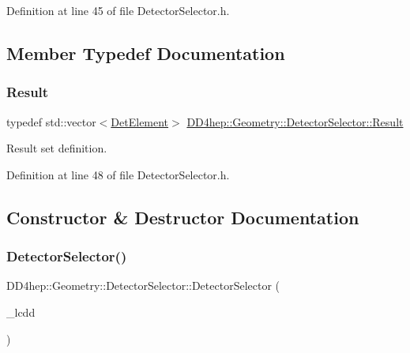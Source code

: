 Definition at line 45 of file Detector\+Selector.\+h.



\subsection{Member Typedef Documentation}
\hypertarget{class_d_d4hep_1_1_geometry_1_1_detector_selector_a6ce0dfe8c83f5d36138244218f260ed1}{}\label{class_d_d4hep_1_1_geometry_1_1_detector_selector_a6ce0dfe8c83f5d36138244218f260ed1} 
\subsubsection{\texorpdfstring{Result}{Result}}
{\footnotesize\ttfamily typedef std\+::vector$<$\hyperlink{class_d_d4hep_1_1_geometry_1_1_det_element}{Det\+Element}$>$ \hyperlink{class_d_d4hep_1_1_geometry_1_1_detector_selector_a6ce0dfe8c83f5d36138244218f260ed1}{D\+D4hep\+::\+Geometry\+::\+Detector\+Selector\+::\+Result}}



Result set definition. 



Definition at line 48 of file Detector\+Selector.\+h.



\subsection{Constructor \& Destructor Documentation}
\hypertarget{class_d_d4hep_1_1_geometry_1_1_detector_selector_a683570559af13a80725cf14d8c3cd4b6}{}\label{class_d_d4hep_1_1_geometry_1_1_detector_selector_a683570559af13a80725cf14d8c3cd4b6} 
\subsubsection{\texorpdfstring{Detector\+Selector()}{DetectorSelector()}}
{\footnotesize\ttfamily D\+D4hep\+::\+Geometry\+::\+Detector\+Selector\+::\+Detector\+Selector (\begin{DoxyParamCaption}\item[{\hyperlink{class_d_d4hep_1_1_geometry_1_1_l_c_d_d}{L\+C\+DD} \&}]{\+\_\+lcdd }\end{DoxyParamCaption})\hspace{0.3cm}{\ttfamily [inline]}}



